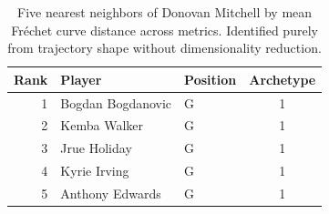 \begin{table}[htbp]
  \centering\small
  \begin{tabular}{rllc}
    \toprule
    Rank & Player & Position & Archetype \\
    \midrule
    1 & Bogdan Bogdanovic & G & 1 \\
    2 & Kemba Walker & G & 1 \\
    3 & Jrue Holiday & G & 1 \\
    4 & Kyrie Irving & G & 1 \\
    5 & Anthony Edwards & G & 1 \\
    \bottomrule
  \end{tabular}
  \caption{Five nearest neighbors of Donovan Mitchell by mean Fr\'{e}chet curve distance across metrics. Identified purely from trajectory shape without dimensionality reduction.}
  \label{tab:Donovan_Mitchell_frechet_curve_neighbors}
\end{table}

